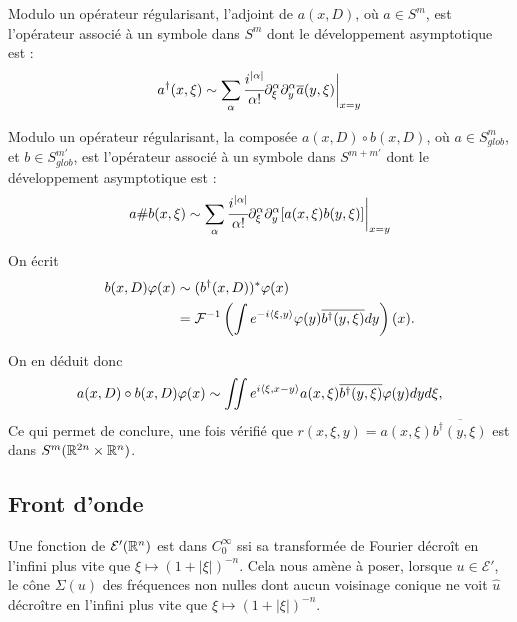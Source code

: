 \begin{corr}
	Modulo un opérateur régularisant, l'adjoint de $a(x,D)$, où $a \in S^m$, est l'opérateur associé à un symbole dans $S^m$ dont le développement asymptotique est :
	\begin{equation*}
		a^{\dagger}(x,\xi)\sim \sum_{\alpha}\cfrac{i^{|\alpha|}}{\alpha!}\partial^{\alpha}_{\xi}\partial^{\alpha}_y\overline{a}(y,\xi)\biggl|_{x=y}
	\end{equation*}
\end{corr}

\begin{corr}
	Modulo un opérateur régularisant, la composée $a(x,D)\circ b(x,D)$, où $a\in S^m_{glob}$, et $b \in S^{m'}_{glob}$, est l'opérateur associé à un symbole dans $S^{m+m'}$ dont le développement asymptotique est :
	\begin{equation*}
		a\#b(x,\xi)\sim \sum_{\alpha}\cfrac{i^{|\alpha|}}{\alpha!}\partial^{\alpha}_{\xi}\partial^{\alpha}_y[a(x,\xi)b(y,\xi)]\biggl|_{x=y}
	\end{equation*}
\end{corr}
\begin{preuve}
	On écrit 
	\begin{align*}
		b(x,D)\varphi(x) &\sim (b^{\dagger}(x,D))^*\varphi(x)\\
		&= \mathcal{F}^{-1}\left(\int e^{-i\langle \xi,y\rangle}\varphi(y)\overline{b^{\dagger}(y,\xi)}dy\right)(x).
	\end{align*}
	
	On en déduit donc
	\begin{equation*}
		a(x,D)\circ b(x,D) \varphi(x) \sim \iint e^{i\langle \xi,x-y\rangle}a(x,\xi)\overline{b^{\dagger}(y,\xi)}\varphi(y)dyd\xi,
	\end{equation*}
	Ce qui permet de conclure, une fois vérifié que $r(x,\xi,y)=a(x,\xi)\overline{b^{\dagger}(y,\xi)}$ est dans $S^m(\mathbb{R}^{2n}\times \mathbb{R}^n)$.
\end{preuve}

\subsection{Front d'onde}

Une fonction de $\mathcal{E}'(\mathbb{R}^n)$ est dans $C^{\infty}_0$ ssi sa transformée de Fourier décroît en l'infini plus vite que $\xi \mapsto (1+|\xi|)^{-n}$. Cela nous amène à poser, lorsque $ u \in \mathcal{E}'$, le cône $\Sigma(u)$ des fréquences non nulles dont aucun voisinage conique ne voit $\hat{u}$ décroître en l'infini plus vite que $\xi \mapsto (1+|\xi|)^{-n}$. 

